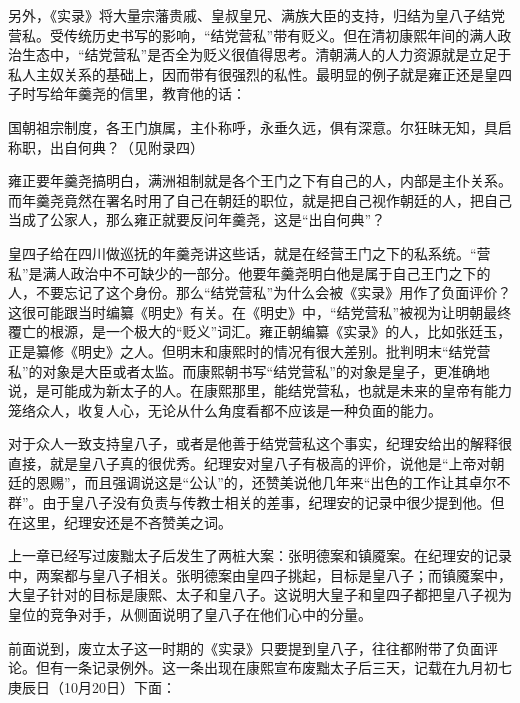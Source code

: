
另外，《实录》将大量宗藩贵戚、皇叔皇兄、满族大臣的支持，归结为皇八子结党营私。受传统历史书写的影响，“结党营私”带有贬义。但在清初康熙年间的满人政治生态中，“结党营私”是否全为贬义很值得思考。清朝满人的人力资源就是立足于私人主奴关系的基础上，因而带有很强烈的私性。最明显的例子就是雍正还是皇四子时写给年羹尧的信里，教育他的话：



\begin{bookquote}国朝祖宗制度，各王门旗属，主仆称呼，永垂久远，俱有深意。尔狂昧无知，具启称职，出自何典？（见附录四）\end{bookquote}


雍正要年羹尧搞明白，满洲祖制就是各个王门之下有自己的人，内部是主仆关系。而年羹尧竟然在署名时用了自己在朝廷的职位，就是把自己视作朝廷的人，把自己当成了公家人，那么雍正就要反问年羹尧，这是“出自何典”？



皇四子给在四川做巡抚的年羹尧讲这些话，就是在经营王门之下的私系统。“营私”是满人政治中不可缺少的一部分。他要年羹尧明白他是属于自己王门之下的人，不要忘记了这个身份。那么“结党营私”为什么会被《实录》用作了负面评价？这很可能跟当时编纂《明史》有关。在《明史》中，“结党营私”被视为让明朝最终覆亡的根源，是一个极大的“贬义”词汇。雍正朝编纂《实录》的人，比如张廷玉，正是纂修《明史》之人。但明末和康熙时的情况有很大差别。批判明末“结党营私”的对象是大臣或者太监。而康熙朝书写“结党营私”的对象是皇子，更准确地说，是可能成为新太子的人。在康熙那里，能结党营私，也就是未来的皇帝有能力笼络众人，收复人心，无论从什么角度看都不应该是一种负面的能力。



对于众人一致支持皇八子，或者是他善于结党营私这个事实，纪理安给出的解释很直接，就是皇八子真的很优秀。纪理安对皇八子有极高的评价，说他是“上帝对朝廷的恩赐”，而且强调说这是“公认”的，还赞美说他几年来“出色的工作让其卓尔不群”。由于皇八子没有负责与传教士相关的差事，纪理安的记录中很少提到他。但在这里，纪理安还是不吝赞美之词。



上一章已经写过废黜太子后发生了两桩大案：张明德案和镇魇案。在纪理安的记录中，两案都与皇八子相关。张明德案由皇四子挑起，目标是皇八子；而镇魇案中，大皇子针对的目标是康熙、太子和皇八子。这说明大皇子和皇四子都把皇八子视为皇位的竞争对手，从侧面说明了皇八子在他们心中的分量。



前面说到，废立太子这一时期的《实录》只要提到皇八子，往往都附带了负面评论。但有一条记录例外。这一条出现在康熙宣布废黜太子后三天，记载在九月初七庚辰日（10月20日）下面：


